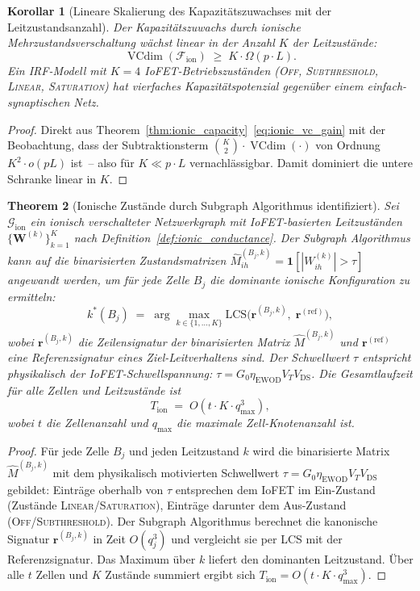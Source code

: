 ﻿\documentclass[12pt, a4paper, openany]{report}
\newtheorem{theorem}{Theorem}[chapter]
\newtheorem{corollary}[theorem]{Korollar}
\newcommand{\calG}{\mathcal{G}}
\newcommand{\calF}{\mathcal{F}}
\DeclareMathOperator{\VC}{VCdim}
\begin{document}
\begin{corollary}[Lineare Skalierung des Kapazitätszuwachses mit der Leitzustandsanzahl]
\label{cor:ionic_linear}
Der Kapazitätszuwachs durch ionische Mehrzustandsverschaltung wächst
linear in der Anzahl $K$ der Leitzustände:
\[
  \VC(\calF_{\mathrm{ion}}) \;\geq\; K \cdot \Omega(p \cdot L).
\]
Ein IRF-Modell mit $K = 4$ IoFET-Betriebszuständen
(\textsc{Off}, \textsc{Subthreshold}, \textsc{Linear}, \textsc{Saturation})
hat vierfaches Kapazitätspotenzial gegenüber einem einfach-synaptischen Netz.
\end{corollary}

\begin{proof}
Direkt aus Theorem~\ref{thm:ionic_capacity}~\eqref{eq:ionic_vc_gain} mit
der Beobachtung, dass der Subtraktionsterm $\binom{K}{2}\cdot\VC(\cdot)$
von Ordnung $K^2 \cdot o(pL)$ ist~-- also für $K \ll p\cdot L$ vernachlässigbar.
Damit dominiert die untere Schranke linear in $K$.
\end{proof}

\begin{theorem}[Ionische Zustände durch Subgraph Algorithmus identifiziert]
\label{thm:ionic_subgraph}
Sei $\calG_{\mathrm{ion}}$ ein ionisch verschalteter Netzwerkgraph mit
IoFET-basierten Leitzuständen $\{\bm{W}^{(k)}\}_{k=1}^K$ nach
Definition~\ref{def:ionic_conductance}.  Der Subgraph Algorithmus kann auf
die binarisierten Zustandsmatrizen
$\hat{M}^{(B_j,k)}_{ih} = \mathbf{1}[|W^{(k)}_{ih}| > \tau]$
angewandt werden, um für jede Zelle $B_j$ die \emph{dominante ionische
Konfiguration} zu ermitteln:
\begin{equation}
  \label{eq:ionic_dominant}
  k^*(B_j)
  \;=\; \arg\max_{k \in \{1,\ldots,K\}}
  \mathrm{LCS}\!\bigl(\bm{r}^{(B_j, k)},\; \bm{r}^{(\mathrm{ref})}\bigr),
\end{equation}
wobei $\bm{r}^{(B_j, k)}$ die Zeilensignatur der binarisierten Matrix
$\hat{M}^{(B_j,k)}$ und $\bm{r}^{(\mathrm{ref})}$ eine
Referenzsignatur eines Ziel-Leitverhaltens sind.
Der Schwellwert $\tau$ entspricht physikalisch der IoFET-Schwellspannung:
$\tau = G_0 \eta_{\mathrm{EWOD}} V_T V_{\mathrm{DS}}$.
Die Gesamtlaufzeit für alle Zellen und Leitzustände ist
\[
  T_{\mathrm{ion}} \;=\; O(t \cdot K \cdot q_{\max}^3),
\]
wobei $t$ die Zellenanzahl und $q_{\max}$ die maximale Zell-Knotenanzahl ist.
\end{theorem}

\begin{proof}
Für jede Zelle $B_j$ und jeden Leitzustand $k$ wird die binarisierte
Matrix $\hat{M}^{(B_j,k)}$ mit dem physikalisch motivierten Schwell\-wert
$\tau = G_0 \eta_{\mathrm{EWOD}} V_T V_\mathrm{DS}$ gebildet: Einträge
oberhalb von $\tau$ entsprechen dem IoFET im Ein-Zustand (Zustände
\textsc{Linear}/\textsc{Saturation}), Einträge darunter dem Aus-Zustand
(\textsc{Off}/\textsc{Subthreshold}).  Der Subgraph Algorithmus berechnet
die kanonische Signatur $\bm{r}^{(B_j, k)}$ in Zeit $O(q_j^3)$ und
vergleicht sie per LCS mit der Referenzsignatur.  Das Maximum über $k$
liefert den dominanten Leitzustand.  Über alle $t$ Zellen und $K$ Zustände
summiert ergibt sich $T_{\mathrm{ion}} = O(t \cdot K \cdot q_{\max}^3)$.
\end{proof}
\end{document}
